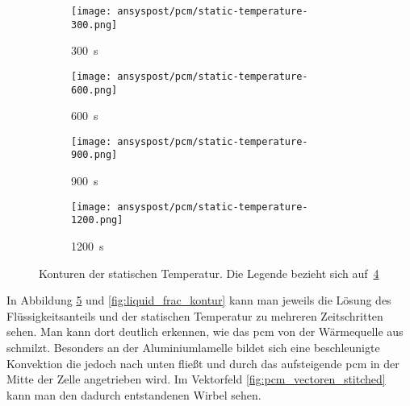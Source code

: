 \begin{figure}
\begin{minipage}[t]{0.485\textwidth}
        \label{fig:liquid_frac_kontur}
    \end{minipage}
    \hspace{2mm} %
    \begin{minipage}[t]{0.485\textwidth}
        \centering
        \begin{subfigure}[t]{0.16\textwidth}
            \centering
        \end{subfigure}%
        \hspace{2mm}%
        \begin{subfigure}[t]{0.2\textwidth}
            \centering
            \texttt{[image: ansyspost/pcm/static-temperature-300.png]}
            \caption{\SI{300}{\second}}\label{fig:temperatur_300}
        \end{subfigure}%
        \begin{subfigure}[t]{0.2\textwidth}
            \centering
            \texttt{[image: ansyspost/pcm/static-temperature-600.png]}
            \caption{\SI{600}{\second}}\label{fig:temperatur_600}
        \end{subfigure}%
        \begin{subfigure}[t]{0.2\textwidth}
            \centering
            \texttt{[image: ansyspost/pcm/static-temperature-900.png]}
            \caption{\SI{900}{\second}}\label{fig:temperatur_900}
        \end{subfigure}%
        \begin{subfigure}[t]{0.2\textwidth}
            \centering
            \texttt{[image: ansyspost/pcm/static-temperature-1200.png]}
            \caption{\SI{1200}{\second}}\label{fig:temperatur_1200}
        \end{subfigure}
        \caption{Konturen der statischen Temperatur. Die Legende bezieht sich auf~\ref{fig:temperatur_1200}}
        \label{fig:static_temperature_kontur}
    \end{minipage}

\end{figure}

In Abbildung \ref{fig:static_temperature_kontur} und \ref{fig:liquid_frac_kontur} kann man jeweils die Lösung des Flüssigkeitsanteils
und der statischen Temperatur zu mehreren Zeitschritten sehen. Man kann dort deutlich erkennen, wie das \ac{pcm} von der Wärmequelle aus
schmilzt. Besonders an der Aluminiumlamelle bildet sich eine beschleunigte Konvektion die jedoch nach unten fließt und durch das aufsteigende
\ac{pcm} in der Mitte der Zelle angetrieben wird. Im Vektorfeld \ref{fig:pcm_vectoren_stitched} kann man den dadurch entstandenen Wirbel sehen.

